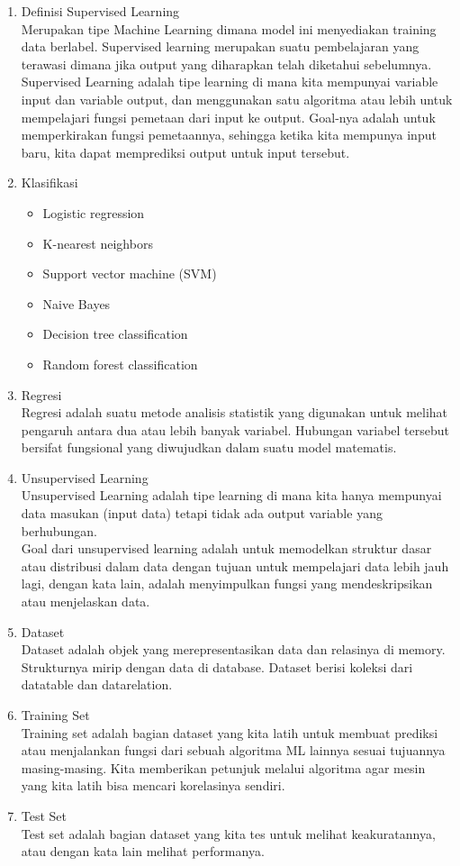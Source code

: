 \begin{enumerate}
\begin{itemize}
\end{itemize}
\item Definisi Supervised Learning \\
Merupakan tipe Machine Learning dimana model ini menyediakan training data berlabel. Supervised learning merupakan suatu pembelajaran yang terawasi dimana jika output yang diharapkan telah diketahui sebelumnya.  Supervised Learning adalah tipe learning di mana kita mempunyai variable input dan variable output, dan menggunakan satu algoritma atau lebih untuk mempelajari fungsi pemetaan dari input ke output. Goal-nya adalah untuk memperkirakan fungsi pemetaannya, sehingga ketika kita mempunya input baru, kita dapat memprediksi output untuk input tersebut.

\item Klasifikasi
\begin{itemize}
\item Logistic regression
\item K-nearest neighbors
\item Support vector machine (SVM)
\item Naive Bayes
\item Decision tree classification
\item Random forest classification
\end{itemize}

\item Regresi \\
Regresi adalah suatu metode analisis statistik yang digunakan untuk melihat pengaruh antara dua atau lebih banyak variabel. Hubungan variabel tersebut bersifat fungsional yang diwujudkan dalam suatu model matematis.

\item Unsupervised Learning \\
Unsupervised Learning adalah tipe learning di mana kita hanya mempunyai data masukan (input data) tetapi tidak ada output variable yang berhubungan.\\
Goal dari unsupervised learning adalah untuk memodelkan struktur dasar atau distribusi dalam data dengan tujuan untuk mempelajari data lebih jauh lagi, dengan kata lain, adalah menyimpulkan fungsi yang mendeskripsikan atau menjelaskan data.

\item Dataset \\
Dataset adalah objek yang merepresentasikan data dan relasinya di memory. Strukturnya mirip dengan data di database. Dataset berisi koleksi dari datatable dan datarelation.
\item Training Set \\
Training set adalah bagian dataset yang kita latih untuk membuat prediksi atau menjalankan fungsi dari sebuah algoritma ML lainnya sesuai tujuannya masing-masing. Kita memberikan petunjuk melalui algoritma agar mesin yang kita latih bisa mencari korelasinya sendiri.
\item Test Set \\
Test set adalah bagian dataset yang kita tes untuk melihat keakuratannya, atau dengan kata lain melihat performanya.

\end{enumerate}
